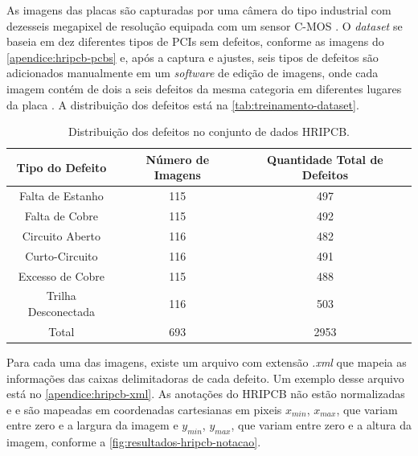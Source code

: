 As imagens das placas são capturadas por uma câmera do tipo industrial com dezesseis megapixel de resolução equipada com um sensor C-MOS \cite{ref:Huang-et-al}. O \textit{dataset} se baseia em dez diferentes tipos de PCIs sem defeitos, conforme as imagens do \autoref{apendice:hripcb-pcbs} e, após a captura e ajustes, seis tipos de defeitos são adicionados manualmente em um \textit{software} de edição de imagens, onde cada imagem contém de dois a seis defeitos da mesma categoria em diferentes lugares da placa \cite{ref:Huang-et-al}. A distribuição dos defeitos está na \autoref{tab:treinamento-dataset}.

\begin{table}[!h]
\begin{center}
\caption{Distribuição dos defeitos no conjunto de dados HRIPCB.}
\label{tab:treinamento-dataset}
\begin{tabular}{ccc}
\toprule
\textbf{Tipo do Defeito} & \textbf{Número de Imagens} & \textbf{Quantidade Total de Defeitos} \\
\midrule \midrule
Falta de Estanho    & 115   & 497 \\
Falta de Cobre      & 115   & 492 \\
Circuito Aberto     & 116   & 482 \\
Curto-Circuito      & 116   & 491 \\
Excesso de Cobre    & 115   & 488 \\
Trilha Desconectada & 116   & 503 \\
Total               & 693   & 2953 \\
\bottomrule
\end{tabular}
\end{center}
\end{table}

Para cada uma das imagens, existe um arquivo com extensão \textit{.xml} que mapeia as informações das caixas delimitadoras de cada defeito. Um exemplo desse arquivo está no \autoref{apendice:hripcb-xml}.
As anotações do HRIPCB não estão normalizadas e e são mapeadas em coordenadas cartesianas em pixeis $x_{min}$, $x_{max}$, que variam entre zero e a largura da imagem e $y_{min}$, $y_{max}$, que variam entre zero e a altura da imagem, conforme a \autoref{fig:resultados-hripcb-notacao}.

